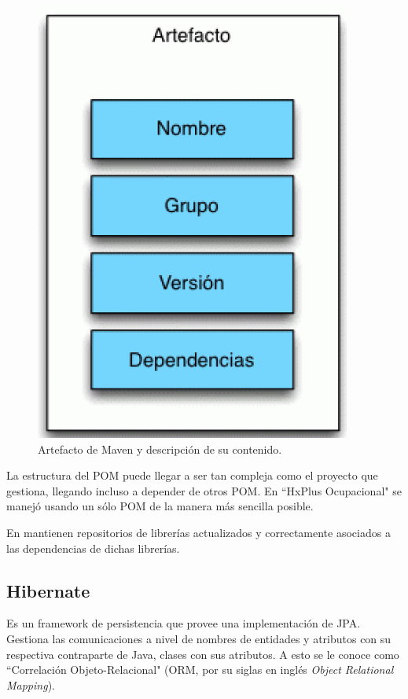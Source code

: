         \begin{figure}[htbp!]
            \begin{center}
                \includegraphics[scale=0.4]{figures/pomartifact}
            \end{center}
            \caption{Artefacto de Maven y descripción de su contenido.}
            \label{pom-artifact}
        \end{figure}
        
        La estructura del POM puede llegar a ser tan compleja como el proyecto que gestiona, llegando incluso a depender de otros POM. En ``HxPlus Ocupacional" se manejó usando un sólo POM de la manera más sencilla posible.
        
        En \cite{APACHE-maven} mantienen repositorios de librerías actualizados y correctamente asociados a las dependencias de dichas librerías.
        
        \subsection{Hibernate}
        \label{tecno-hibernate}
        
        Es un framework de persistencia que provee una implementación de JPA\cite{HIBERNATE-basico}. Gestiona las comunicaciones a nivel de nombres de entidades y atributos con su respectiva contraparte de Java, clases con sus atributos. A esto se le conoce como ``Correlación Objeto-Relacional" (ORM, por su siglas en inglés \textit{Object Relational Mapping}).
        
